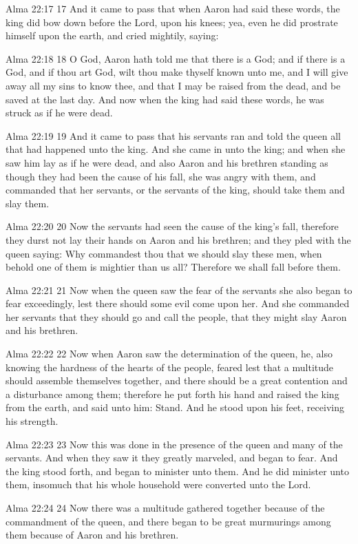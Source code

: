 Alma 22:17
 17 And it came to pass that when Aaron had said these words, the
king did bow down before the Lord, upon his knees; yea, even he
did prostrate himself upon the earth, and cried mightily, saying:

Alma 22:18
 18 O God, Aaron hath told me that there is a God; and if there
is a God, and if thou art God, wilt thou make thyself known unto
me, and I will give away all my sins to know thee, and that I may
be raised from the dead, and be saved at the last day. And now
when the king had said these words, he was struck as if he were
dead.

Alma 22:19
 19 And it came to pass that his servants ran and told the queen
all that had happened unto the king. And she came in unto the
king; and when she saw him lay as if he were dead, and also Aaron
and his brethren standing as though they had been the cause of
his fall, she was angry with them, and commanded that her
servants, or the servants of the king, should take them and slay
them.

Alma 22:20
 20 Now the servants had seen the cause of the king's fall,
therefore they durst not lay their hands on Aaron and his
brethren; and they pled with the queen saying: Why commandest
thou that we should slay these men, when behold one of them is
mightier than us all? Therefore we shall fall before them.

Alma 22:21
 21 Now when the queen saw the fear of the servants she also
began to fear exceedingly, lest there should some evil come upon
her. And she commanded her servants that they should go and call
the people, that they might slay Aaron and his brethren.

Alma 22:22
 22 Now when Aaron saw the determination of the queen, he, also
knowing the hardness of the hearts of the people, feared lest
that a multitude should assemble themselves together, and there
should be a great contention and a disturbance among them;
therefore he put forth his hand and raised the king from the
earth, and said unto him: Stand. And he stood upon his feet,
receiving his strength.

Alma 22:23
 23 Now this was done in the presence of the queen and many of
the servants. And when they saw it they greatly marveled, and
began to fear. And the king stood forth, and began to minister
unto them. And he did minister unto them, insomuch that his
whole household were converted unto the Lord.

Alma 22:24
 24 Now there was a multitude gathered together because of the
commandment of the queen, and there began to be great murmurings
among them because of Aaron and his brethren.

